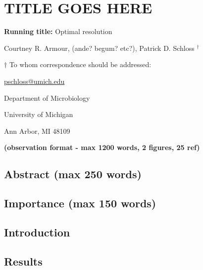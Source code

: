 \documentclass[
]{article}
\author{}
\date{\vspace{-2.5em}}
\begin{document}
\hypertarget{title-goes-here}{%
\section{TITLE GOES HERE}\label{title-goes-here}}

\vspace{20mm}

\textbf{Running title:} Optimal resolution

\vspace{10mm}

Courtney R. Armour, (ande? begum? etc?), Patrick D. Schloss
\({^\dagger}\)

\vspace{20mm}

\({\dagger}\) To whom correspondence should be addressed:

\href{mailto:pschloss@umich.edu}{pschloss@umich.edu}

Department of Microbiology

University of Michigan

Ann Arbor, MI 48109

\vspace{20mm}

\textbf{(observation format - max 1200 words, 2 figures, 25 ref)}

\newpage

\hypertarget{abstract-max-250-words}{%
\subsection{Abstract (max 250 words)}\label{abstract-max-250-words}}

\hypertarget{importance-max-150-words}{%
\subsection{Importance (max 150 words)}\label{importance-max-150-words}}

\newpage

\hypertarget{introduction}{%
\subsection{Introduction}\label{introduction}}

\newpage

\hypertarget{results}{%
\subsection{Results}\label{results}}
\end{document}
